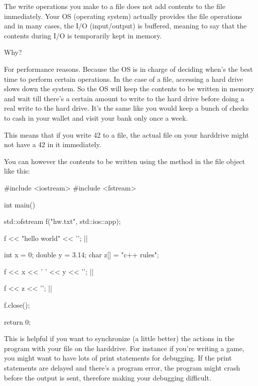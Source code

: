 \begin{consolethree}[escapeinside=||]
\newpage{}

The write operations you make to a file does not add contents to the file immediately. Your OS (operating system) actually provides the file operations and in many cases, the I/O (input/output) is buffered, meaning to say that the contents during I/O is temporarily kept in memory.

Why?

For performance reasons. Because the OS is in charge of deciding when's the best time to perform certain operations. In the case of a file, accessing a hard drive slows down the system. So the OS will keep the contents to be written in memory and wait till there's a certain amount to write to the hard drive before doing a real write to the hard drive. It's the same like you would keep a bunch of checks to cash in your wallet and visit your bank only once a week.

This means that if you write 42 to a file, the actual file on your harddrive might not have a 42 in it immediately.

You can however  the contents to be written  using the  method in the file object like this:

\begin{consolethree}[escapeinside=||]
#include <iostream>
#include <fstream>

int main()
{   
    std::ofstream f("hw.txt", std::ios::app);

    f << "hello world" << '\n';
    ||

    int x = 0;
    double y = 3.14;
    char z[] = "c++ rules";

    f << x << ' ' << y << '\n';
    ||

    f << z << '\n';
    ||

    f.close();

    return 0;

}
\end{consolethree}

This is helpful if you want to synchronize (a little better) the actions in the program with your file on the harddrive. For instance if you're writing a game, you might want to have lots of print statements for debugging. If the print statements are delayed and there's a program error, the program might crash before the output is sent, therefore making your debugging difficult.


\end{consolethree}
